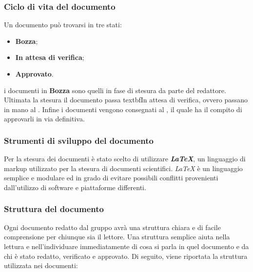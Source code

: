 		\subsubsection{Ciclo di vita del documento}
		Un documento può trovarsi in tre stati:
		\begin{itemize}
			\item \textbf{Bozza};
			\item \textbf{In attesa di verifica};
			\item \textbf{Approvato}.
		\end{itemize}
		
		i documenti in \textbf{Bozza} sono quelli in fase di stesura da parte del redattore. Ultimata la stesura il documento passa textbf{In attesa di verifica}, ovvero passano in mano al \Ver. Infine i documenti vengono consegnati al \RdP, il quale ha il compito di approvarli in via definitiva.
		
		\subsubsection{Strumenti di sviluppo del documento}
		Per la stesura dei documenti è stato scelto di utilizzare \textbf{\textit{\LaTeX{}}}, un linguaggio di markup utilizzato per la stesura di documenti scientifici. \textit{\LaTeX{}} è un linguaggio semplice e modulare  ed in grado di evitare possibili conflitti provenienti dall'utilizzo di software e piattaforme differenti.
	
		\subsubsection{Struttura del documento}
		Ogni documento redatto dal gruppo avrà una struttura chiara e di facile comprensione per chiunque sia il lettore. Una struttura semplice aiuta nella lettura e nell'individuare immediatamente di cosa si parla in quel documento e da chi è stato redatto, verificato e approvato.
		Di seguito, viene riportata la struttura utilizzata nei documenti:

